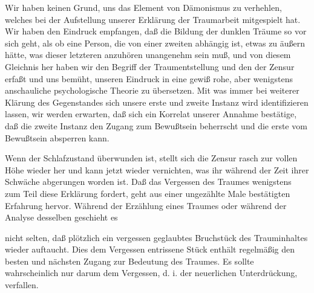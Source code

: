 \documentclass[twoside=true,titlepage=false,open=any, parskip=never, fontsize=10pt, headings=small, chapterprefix=false, appendixprefix=false]{scrbook}
\begin{document}
            
        \pstart
        Wir haben keinen Grund, uns das Element von Dämonismus zu verhehlen, welches bei
               der Aufstellung unserer Erklärung der Traumarbeit mitgespielt hat. Wir haben den
               Eindruck empfangen, daß die Bildung der dunklen Träume so vor sich geht, als ob eine Person, die von einer zweiten
               abhängig ist, etwas zu äußern hätte, was dieser letzteren anzuhören unangenehm
               sein muß, und von diesem Gleichnis her haben wir den Begriff der Traumentstellung und den der Zensur erfaßt und uns bemüht, unseren Eindruck
               in eine gewiß rohe, aber wenigstens anschauliche psychologische
               Theorie zu übersetzen. Mit was immer bei weiterer Klärung des Gegenstandes sich
               unsere erste und zweite Instanz wird identifizieren lassen, wir werden erwarten,
               daß sich ein Korrelat unserer Annahme bestätige, daß die zweite Instanz den
               Zugang zum Bewußtsein beherrscht und die erste vom Bewußtsein absperren
               kann.
        \pend
    
            
        \pstart
        Wenn der Schlafzustand überwunden ist, stellt sich die Zensur rasch zur vollen
               Höhe wieder her und kann jetzt wieder vernichten, was ihr während der
               Zeit ihrer Schwäche abgerungen worden ist. Daß das Vergessen des Traumes wenigstens zum Teil
               diese Erklärung fordert, geht aus einer ungezählte Male bestätigten Erfahrung
               hervor. Während der Erzählung eines Traumes oder während der Analyse desselben
               geschieht es
            
        \pend
    
         
            
            
            
        \pstart
        nicht selten, daß plötzlich ein vergessen geglaubtes Bruchstück des
               Trauminhaltes wieder auftaucht. Dies dem Vergessen entrissene Stück
               enthält regelmäßig den besten und nächsten Zugang zur Bedeutung des Traumes. Es
               sollte wahrscheinlich nur darum dem Vergessen, d. i. der neuerlichen
               Unterdrückung, verfallen.
            
        \pend
    
         
            
            
            \pstart[\section{XI}]\pend
            
\end{document}
